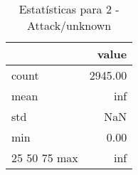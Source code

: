 \begin{table}[htbp]
\caption{Estatísticas para 2 - Attack/unknown}
\label{tab:2_-_attack_unknown_summary}
\begin{tabular}{lr}
\toprule
 & value \\
\midrule
count & 2945.00 \\
mean & inf \\
std & NaN \\
min & 0.00 \\
25%
50%
75%
max & inf \\
\bottomrule
\end{tabular}
\end{table}
